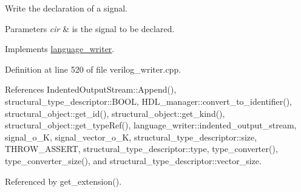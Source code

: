 Write the declaration of a signal. 


\begin{DoxyParams}{Parameters}
{\em cir} & is the signal to be declared. \\
\hline
\end{DoxyParams}


Implements \hyperlink{classlanguage__writer_ae574f2a7e9cb7904172ce08aab243f8e}{language\+\_\+writer}.



Definition at line 520 of file verilog\+\_\+writer.\+cpp.



References Indented\+Output\+Stream\+::\+Append(), structural\+\_\+type\+\_\+descriptor\+::\+B\+O\+OL, H\+D\+L\+\_\+manager\+::convert\+\_\+to\+\_\+identifier(), structural\+\_\+object\+::get\+\_\+id(), structural\+\_\+object\+::get\+\_\+kind(), structural\+\_\+object\+::get\+\_\+type\+Ref(), language\+\_\+writer\+::indented\+\_\+output\+\_\+stream, signal\+\_\+o\+\_\+K, signal\+\_\+vector\+\_\+o\+\_\+K, structural\+\_\+type\+\_\+descriptor\+::size, T\+H\+R\+O\+W\+\_\+\+A\+S\+S\+E\+RT, structural\+\_\+type\+\_\+descriptor\+::type, type\+\_\+converter(), type\+\_\+converter\+\_\+size(), and structural\+\_\+type\+\_\+descriptor\+::vector\+\_\+size.



Referenced by get\+\_\+extension().

